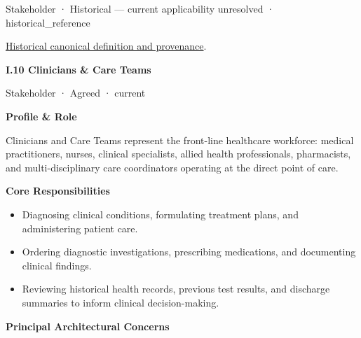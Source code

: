 \label{element:6f5a203d81e24a81b384a80781987daa}
{\small Stakeholder · Historical — current applicability unresolved · historical\_reference}\par
\href{../../../../continuum/motivation/stakeholder/6f5a203d81e24a81b384a80781987daa.md}{Historical canonical definition and provenance}.\par
\par\medskip{}\label{navigation:I.10}
\textbf{I.10 Clinicians \& Care Teams}\par

\label{element:37264af5adb64b37b7537e3d48b6747b}
{\small Stakeholder · Agreed · current}\par

\par\medskip\textbf{Profile \& Role}\par


Clinicians and Care Teams represent the front-line healthcare workforce: medical practitioners, nurses, clinical specialists, allied health professionals, pharmacists, and multi-disciplinary care coordinators operating at the direct point of care.



\par\medskip\textbf{Core Responsibilities}\par


\begin{itemize}


\item Diagnosing clinical conditions, formulating treatment plans, and administering patient care.

\item Ordering diagnostic investigations, prescribing medications, and documenting clinical findings.

\item Reviewing historical health records, previous test results, and discharge summaries to inform clinical decision-making.

\end{itemize}


\par\medskip\textbf{Principal Architectural Concerns}\par


